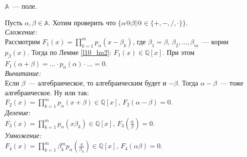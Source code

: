 \begin{theorem} \label{l10_th1}
	$\mathbb{A}$ — поле.
\end{theorem}
\begin{pf}
	Пусть $\alpha, \beta \in \mathbb{A}$. Хотим проверить что $\{ \alpha @ \beta \vert @ \in \{+, -, /, \cdot \} \}$.\\
	\textit{Сложение:}\\
	Рассмотрим $\displaystyle F_1(x) = \prod\limits_{k=1}^m p_\alpha\left( x-\beta_k \right)$, где $\beta_1 = \beta, \, \beta_2,\dots,\beta_m$ — корни $p_\beta(x)$. Тогда по Лемме \ref{l10_lm2}: $F_1(x) \in \mathbb{Q}[x]$. При этом $\displaystyle F_1(\alpha + \beta) = \dots \cdot p_\alpha(\alpha) \cdot \dots = 0$.\\
	\textit{Вычитание:}\\
Если $\beta$ — алгебраическое, то алгебраическим будет и $-\beta$. Тогда $\alpha-\beta$ — тоже алгебраическое. Ну или так: $\displaystyle F_2(x) = \prod\limits_{k=1}^m p_\alpha \left( x+\beta \right) \in \mathbb{Q}[x], \, F_2(\alpha-\beta)=0$.\\
	\textit{Деление:}\\
	$\displaystyle F_3(x) = \prod\limits_{k=1}^m p_\alpha\left( x\beta_k \right) \in \mathbb{Q}[x], \, F_3\left( \frac{\alpha}{\beta} \right) = 0$.\\
	\textit{Умножение:}\\
	$\displaystyle F_4(x) = \prod\limits_{k=1}^m \beta_k^m p_\alpha\left( \frac{x}{\beta_k} \right) \in \mathbb{Q}[x], \, F_4\left( \alpha\beta \right) = 0$.
\end{pf}